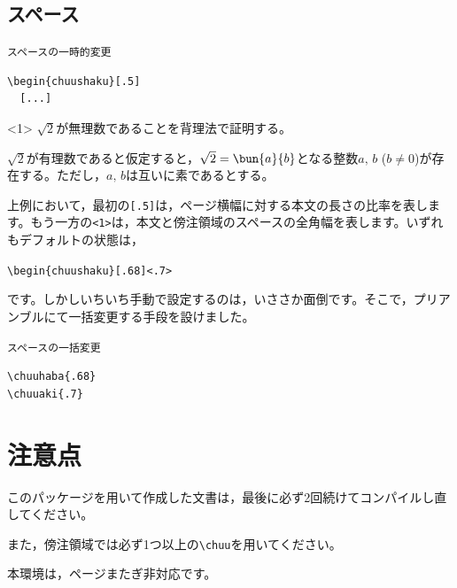 \documentclass[dvipdfmx,b5j,10pt]{jsarticle}%
\begin{document}
\subsection{スペース}%

\begin{itembox}[c]{\texttt{スペースの一時的変更}}
\begin{verbatim}
\begin{chuushaku}[.5]
  [...]
\end{verbatim}
\end{itembox}
\begin{結果}
\begin{chuushaku}[.5]<1>
  $\sqrt{2}$が無理数であることを背理法で証明する。\par
  $\sqrt{2}$が有理数であると仮定すると，$\sqrt{2}=\bun{a}{b}$となる整数$a,\,b$ ($b\neq0$)が存在する。ただし，$a,\,b$は互いに素であるとする。
\end{chuushaku}
\end{結果}

上例において，最初の\texttt{[.5]}は，ページ横幅に対する本文の長さの比率を表します。もう一方の\texttt{<1>}は，本文と傍注領域のスペースの全角幅を表します。いずれもデフォルトの状態は，

\qqquad\verb|\begin{chuushaku}[.68]<.7>|

\noindent です。しかしいちいち手動で設定するのは，いささか面倒です。そこで，プリアンブルにて一括変更する手段を設けました。

\begin{itembox}[c]{\texttt{スペースの一括変更}}
\begin{verbatim}
\chuuhaba{.68}
\chuuaki{.7}
\end{verbatim}
\end{itembox}

\section{注意点}

このパッケージを用いて作成した文書は，最後に必ず2回続けてコンパイルし直してください。

また，傍注領域では必ず1つ以上の\verb|\chuu|を用いてください。

本環境は，ページまたぎ非対応です。
\end{document}
